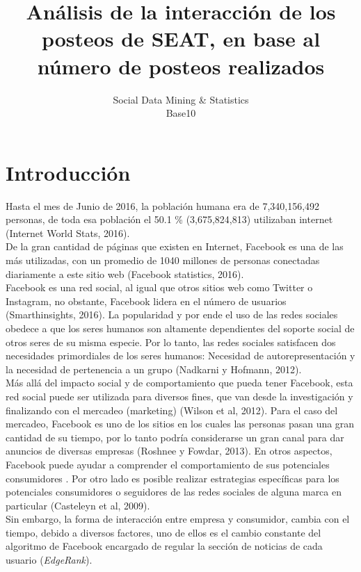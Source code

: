 \documentclass[a4paper,10pt]{article}
\title{Análisis de la interacción de los posteos de SEAT, en base al número de posteos
realizados}
\author{Social Data Mining \& Statistics \\
        Base10}
\date{}
\begin{document}
\maketitle


\section{Introducción}
Hasta el mes de Junio de 2016, la población humana era de 7,340,156,492 personas, 
de toda esa población el 50.1 \% (3,675,824,813) utilizaban internet
(Internet World Stats, 2016).\\
De la gran cantidad de páginas que existen en Internet, Facebook es una de las 
más utilizadas, con un promedio de 1040 millones de personas conectadas diariamente 
a este sitio web (Facebook statistics, 2016).\\
Facebook es una red social, al igual que otros sitios web como Twitter o Instagram,
no obstante, Facebook lidera en el número de usuarios (Smarthinsights, 2016).
La popularidad y por ende el uso de las redes sociales obedece a que los 
seres humanos son altamente dependientes del soporte social de otros seres
de su misma especie. Por lo tanto, las redes sociales satisfacen dos necesidades
primordiales de los seres humanos: Necesidad de autorepresentación y la necesidad
de pertenencia a un grupo (Nadkarni y Hofmann, 2012).\\
Más allá del impacto social y de comportamiento que pueda tener Facebook,
esta red social puede ser utilizada para diversos fines, que van desde la investigación 
y finalizando con el mercadeo (marketing) (Wilson et al, 2012).
Para el caso del mercadeo, Facebook es uno de los sitios en los cuales
las personas pasan una gran cantidad de su tiempo, por lo tanto podría considerarse
un gran canal para dar anuncios de diversas empresas (Roshnee y Fowdar, 2013).
En otros aspectos, Facebook puede ayudar a comprender el 
comportamiento de sus potenciales consumidores .
Por otro lado es posible realizar estrategias específicas para los potenciales
consumidores o seguidores de las redes sociales de alguna marca en particular (Casteleyn et al, 2009).\\
Sin embargo, la forma de interacción entre empresa y consumidor, cambia
con el tiempo, debido a diversos factores, uno de ellos es el cambio constante
del algoritmo de Facebook encargado de regular la sección de noticias de cada usuario (\textit{EdgeRank}).
\end{document}

